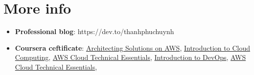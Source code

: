 \documentclass[a4paper,11pt]{article}
\makeatletter
\newcommand{\resumeSubheading}[4]{
    \vspace{-1pt}\item
    \begin{tabular*}{0.97\textwidth}{l@{\extracolsep{\fill}}r}
        \textbf{#1}       & #2                 \\
        \textit{\small#3} & \textit{\small #4} \\
    \end{tabular*}\vspace{-5pt}
}
\newcommand{\resumeSubHeadingListStart}{\begin{itemize}[leftmargin=*]}
\newcommand{\resumeSubHeadingListEnd}{\end{itemize}}
\makeatother
\begin{document}
\section{More info}
\resumeSubHeadingListStart
\item{
\textbf{Professional blog}: https://dev.to/thanhphuchuynh 


}
\item{
\textbf{Coursera ceftificate}: \href{https://www.coursera.org/account/accomplishments/verify/T4ZQ6DDMSU2Z}{Architecting Solutions on AWS}, \href{https://www.coursera.org/account/accomplishments/verify/UEP6SZZRPE4W}{Introduction to Cloud Computing},
\href{https://www.coursera.org/account/accomplishments/verify/SM9VDJSBZ44C}{AWS Cloud Technical Essentials},
\href{https://www.coursera.org/account/accomplishments/verify/SW273Y3U7XZU}{Introduction to DevOps},
\href{https://www.coursera.org/account/accomplishments/verify/SM9VDJSBZ44C}{AWS Cloud Technical Essentials},
}
\resumeSubHeadingListEnd





\end{document}
